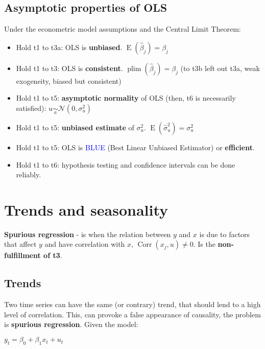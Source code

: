 \documentclass[10pt, a4paper, landscape]{article}
\DeclareMathOperator{\E}{E}
\DeclareMathOperator{\Corr}{Corr}
\begin{document}
\begin{multicols}{3}
\subsection*{Asymptotic properties of OLS}

Under the econometric model assumptions and the Central Limit Theorem:

\begin{itemize}[leftmargin=*]
	\item Hold t1 to t3a: OLS is \textbf{unbiased}. \( \E(\hat{\beta}_{j}) = \beta_{j} \)
	\item Hold t1 to t3: OLS is \textbf{consistent}. \( \operatorname{plim}(\hat{\beta}_{j}) = \beta_{j} \) (to t3b left out t3a, weak exogeneity, biased but consistent)
	\item Hold t1 to t5: \textbf{asymptotic normality} of OLS (then, t6 is necessarily satisfied): \( u \underset{a}{\sim} \mathcal{N} (0, \sigma_{u}^{2}) \)
	\item Hold t1 to t5: \textbf{unbiased estimate} of \( \sigma_{u}^{2} \). \( \E(\hat{\sigma}_{u}^{2}) = \sigma^{2}_{u} \)
	\item Hold t1 to t5: OLS is \textcolor{blue}{BLUE} (Best Linear Unbiased Estimator) or \textbf{efficient}.
	\item Hold t1 to t6: hypothesis testing and confidence intervals can be done reliably.
\end{itemize}

\columnbreak

\section*{Trends and seasonality}

\textbf{Spurious regression} - is when the relation between \( y \) and \( x \) is due to factors that affect \( y \) and have correlation with \( x \), \( \Corr(x_{j}, u) \neq 0 \). Is the \textbf{non-fulfillment of t3}.

\subsection*{Trends}

Two time series can have the same (or contrary) trend, that should lend to a high level of correlation. This, can provoke a false appearance of causality, the problem is \textbf{spurious regression}. Given the model:

\begin{center}
	\( y_{t} = \beta_{0} + \beta_{1} x_{t} + u_{t} \)
\end{center}


\end{multicols}
\end{document}
